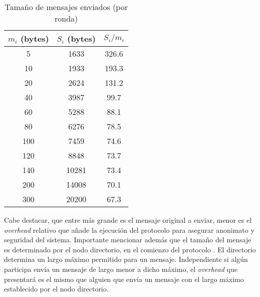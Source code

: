 \begin{table}[h!]
\centering
\begin{tabular}[h!]{|c|c|c|}
\hline
$m_i$ (bytes) & $S_i$ (bytes) & $S_i / m_i$ \\ \hline
5                                   & 1633                               & 326.6       \\ \hline
10                                  & 1933                               & 193.3       \\ \hline
20                                  & 2624                               & 131.2       \\ \hline
40                                  & 3987                               & 99.7        \\ \hline
60                                  & 5288                               & 88.1        \\ \hline
80                                  & 6276                               & 78.5        \\ \hline
100                                 & 7459                               & 74.6        \\ \hline
120                                 & 8848                               & 73.7        \\ \hline
140                                 & 10281                              & 73.4        \\ \hline
200                                 & 14008                              & 70.1        \\ \hline
300                                 & 20200                              & 67.3        \\ \hline
\end{tabular}
\caption{Tamaño de mensajes enviados (por ronda)}
\label{table:message_sizes_table}
\end{table}

Cabe destacar, que entre más grande es el mensaje original a enviar, menor es 
el \emph{overhead} relativo que añade la ejecución del protocolo para asegurar 
anonimato y seguridad del sistema. Importante mencionar además que el tamaño 
del mensaje es determinado por el nodo directorio, en el comienzo del protocolo
. El directorio determina un largo máximo permitido para un mensaje. 
Independiente si algún participa envía un mensaje de largo menor a dicho 
máximo, el \emph{overhead} que presentará es el mismo que alguien que envía un 
mensaje con el largo máximo establecido por el nodo directorio.
